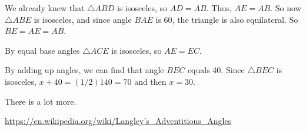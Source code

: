 \documentclass[11pt, oneside]{article}
\begin{document}
We already knew that $\triangle ABD$ is isosceles, so $AD = AB$.  Thus, $AE = AB$.  So now $\triangle ABE$ is isosceles, and since angle $BAE$ is 60, the triangle is also equilateral.  So $BE = AE = AB$.

By equal base angles $\triangle ACE$ is isosceles, so $AE = EC$.

By adding up angles, we can find that angle $BEC$ equals 40.  Since $\triangle BEC$ is isosceles, $x + 40 = (1/2) 140 = 70$ and then $x = 30$.

There is a lot more.

\url{https://en.wikipedia.org/wiki/Langley’s_Adventitious_Angles}
\end{document}
